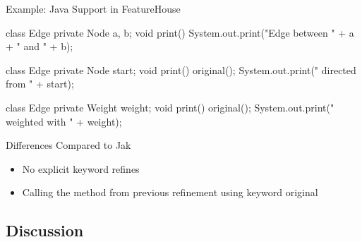 \begin{frame}[fragile]{Example: Java Support in FeatureHouse}
	\begin{fancycolumns}[widths={60,40},animation=none]
\begin{codetight}{}
class Edge {
	private Node a, b;
	void print() {
		System.out.print("Edge between " + a + " and " + b);
	}
}
\end{codetight}
\begin{codetight}{}
class Edge {
	private Node start;
	void print() {
		original();
		System.out.print(" directed from " + start);
	}
}
\end{codetight}
\begin{codetight}{}
class Edge {
	private Weight weight;
	void print() {
		original();
		System.out.print(" weighted with " + weight);
	}
}
\end{codetight}
	\nextcolumn
		\begin{note}{Differences Compared to Jak}
			\begin{itemize}
				\item No explicit keyword refines 
				\item Calling the method from previous refinement using keyword original
			\end{itemize}
		\end{note}
	\end{fancycolumns}
\end{frame}

\subsection{Discussion}

